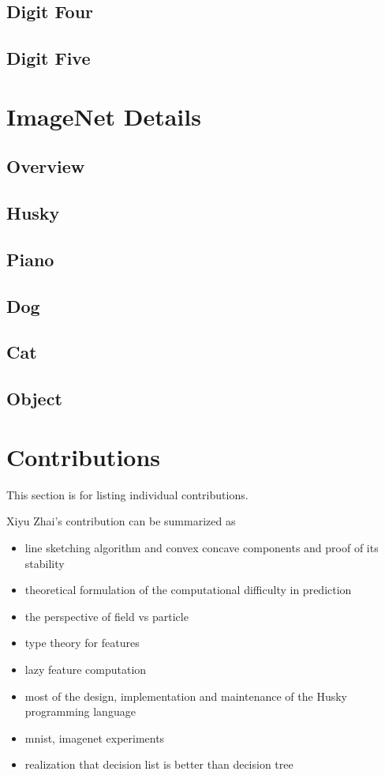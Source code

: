 \documentclass[11pt]{article} 	%
\theoremstyle{definition}
\begin{document}
\subsection{Digit Four}

\subsection{Digit Five}

\section{ImageNet Details}

\subsection{Overview}

\subsection{Husky}

\subsection{Piano}

\subsection{Dog}

\subsection{Cat}

\subsection{Object}

\section{Contributions}

This section is for listing individual contributions.

Xiyu Zhai's contribution can be summarized as
\begin{itemize}
	\item line sketching algorithm and convex concave components and proof of its stability
	\item theoretical formulation of the computational difficulty in prediction
	\item the perspective of field vs particle
	\item type theory for features
	\item lazy feature computation
	\item most of the design, implementation and maintenance of the Husky programming language
	\item mnist, imagenet experiments
	\item realization that decision list is better than decision tree
\end{itemize}
\end{document}
